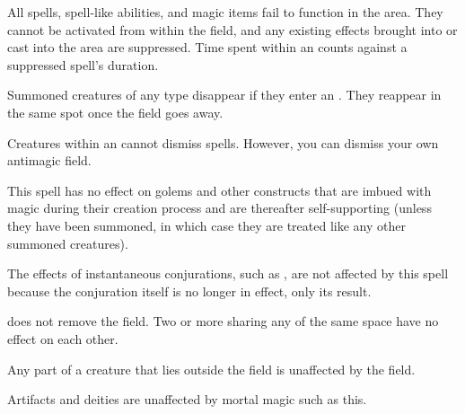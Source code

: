 \begin{spellheader}
\end{spellheader}
\begin{spellcontent}
    \spelleffect All spells, spell-like abilities, and magic items fail to function in the area. They cannot be activated from within the field, and any existing effects brought into or cast into the area are suppressed. Time spent within an  counts against a suppressed spell's duration.
    \par Summoned creatures of any type disappear if they enter an . They reappear in the same spot once the field goes away. 
    \par Creatures within an  cannot dismiss spells. However, you can dismiss your own antimagic field.
    \spelldur{\durlong \dismissable}
\end{spellcontent}
\begin{spellfooter}
    \spellnotes This spell has no effect on golems and other constructs that are imbued with magic during their creation process and are thereafter self-supporting (unless they have been summoned, in which case they are treated like any other summoned creatures).

    The effects of instantaneous conjurations, such as , are not affected by this spell because the conjuration itself is no longer in effect, only its result.

    \par {} does not remove the field. Two or more  sharing any of the same space have no effect on each other.
    \par Any part of a creature that lies outside the field is unaffected by the field.
    \par Artifacts and deities are unaffected by mortal magic such as this. 
\end{spellfooter}


